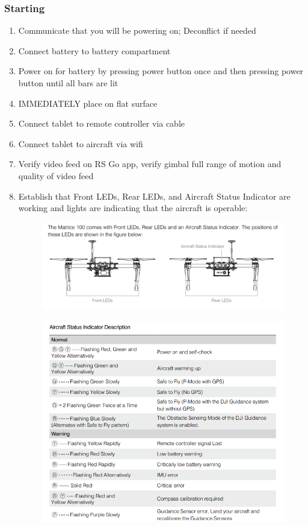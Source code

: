 \subsubsection{Starting}
\begin{enumerate}
\setlength{\itemsep}{0em}
\setlength{\parskip}{0em}
\item Communicate that you will be powering on; Deconflict if needed
\item Connect battery to battery compartment
\item Power on for battery by pressing power button once and then pressing power button until all bars are lit
\item IMMEDIATELY place on flat surface
\item Connect tablet to remote controller via cable
\item Connect tablet to aircraft via wifi
\item Verify video feed on RS Go app, verify gimbal full range of motion and quality of video feed
\item Establish that Front LEDs, Rear LEDs, and Aircraft Status Indicator are working and lights are indicating that the aircraft is operable:
\begin{figure}[h]
\begin{center}
\includegraphics[width=0.8\columnwidth]{figures/op2.png}
\end{center}
\end{figure}  
\begin{figure}[h]
\begin{center}
\includegraphics[width=0.6\columnwidth]{figures/op3.png}

\end{center}
\end{figure}
\end{enumerate}

